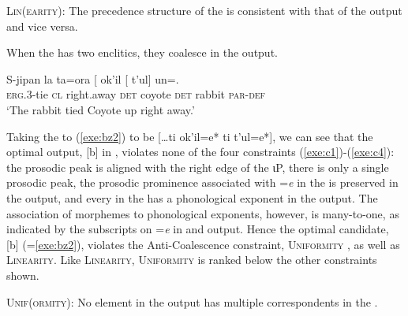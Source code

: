 \documentclass[output=paper,
modfonts
]{LSP/langsci}
\begin{document}
\begin{exe}
\ex \textsc{Lin(earity)}: The precedence structure of the  is consistent with that of the output and vice versa.
\label{exe:c5}
\end{exe}

When the  has two enclitics, they coalesce in the output. 
\begin{exe}
		\ex\label{exe:bz2}\bridgeoverex
		\gll S-jipan la ta=ora [ ok'il [ t'ul] un=.\\
		\textsc{erg.3}-tie \textsc{cl} right.away \textsc{det} coyote \textsc{det} rabbit  \textsc{par-def} \\
		\glt `The rabbit tied Coyote up right away.'  \citep[160]{laughlin1977} 
		\end{exe}
Taking the  to (\ref{exe:bz2}) to be [\dots ti ok'il=e* ti t'ul=e*], we can see that the optimal output,  [b] in , 
violates none of the four constraints (\ref{exe:c1})-(\ref{exe:c4}): the prosodic peak is aligned with the right edge of the ιP, 
there is only a single prosodic peak, the prosodic prominence associated with =\emph{e} in the  is preserved in the output, and 
every  in the  has a phonological exponent in the output. The association of  morphemes to phonological 
exponents, however, is many-to-one, as indicated by the subscripts on =\emph{e} in  and output.
Hence the optimal candidate, [b] (=\ref{exe:bz2}), violates the Anti-Coalescence constraint, \textsc{Uniformity} \citep{mccarthy1995}, 
as well as \textsc{Linearity}.
Like \textsc{Linearity}, \textsc{Uniformity} is ranked below the other constraints shown.
\begin{exe}
\ex \textsc{Unif(ormity)}: No element in the output has multiple correspondents in the .
\label{exe:c6}
\end{exe}
\end{document}
